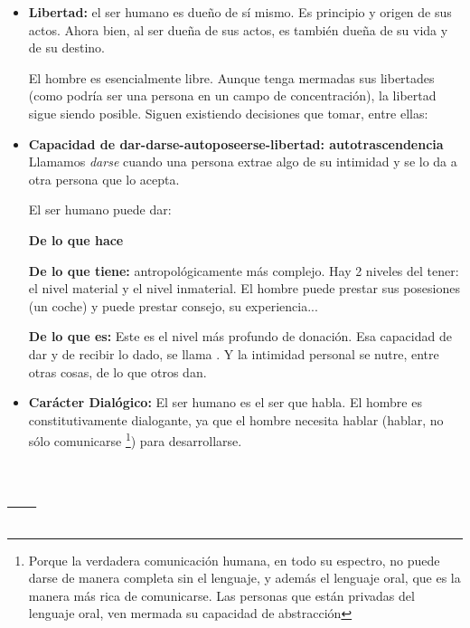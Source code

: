 \documentclass[palatino]{apuntesURJC}
\begin{document}
\begin{itemize}
	\subitem \textbf{Lenguaje:} \footnote{entendiendo lenguaje como lenguaje verbal.}
	A través del lenguaje hago público, comparto con otros aquello que antes estaba dentro de mi.

	El lenguaje tiene mayor capacidad expresiva que el cuerpo y puede permanecer (a través de la escritura sobretodo).

	\subitem \textbf{Acción:}
	Las personas nos damos a conocer con nuestros actos.
	La persona no es sólo sus acciones, pero es aquello que hace. \footnote{No sé si esta afirmación es lógicamente consistente en sí misma.}

	\item \textbf{Libertad:} el ser humano es dueño de sí mismo.
	Es principio y origen de sus actos. Ahora bien, al ser dueña de sus actos, es también dueña de su vida y de su destino.

	\subitem El hombre es esencialmente libre. Aunque tenga mermadas sus libertades (como podría ser una persona en un campo de concentración), la libertad sigue siendo posible.
	Siguen existiendo decisiones que tomar, entre ellas:

	\item \textbf{Capacidad de dar-darse-autoposeerse-libertad: autotrascendencia}
	Llamamos \textit{darse} cuando una persona extrae algo de su intimidad y se lo da a otra persona que lo acepta.

	El ser humano puede dar:

	\subitem \textbf{De lo que hace}

	\subitem \textbf{De lo que tiene:} antropológicamente más complejo. Hay 2 niveles del tener: el nivel material y el nivel inmaterial.
	El hombre puede prestar sus posesiones (un coche) y puede prestar consejo, su experiencia...

	\subitem \textbf{De lo que es:} Este es el nivel más profundo de donación.
	Esa capacidad de dar y de recibir lo dado, se llama .
	Y la intimidad personal se nutre, entre otras cosas, de lo que otros dan.

	\item \textbf{Carácter Dialógico:} El ser humano es el ser que habla.
	El hombre es constitutivamente dialogante, ya que el hombre necesita hablar (hablar, no sólo comunicarse
	\footnote{Porque la verdadera comunicación humana, en todo su espectro, no puede darse de manera completa sin el lenguaje, y además el lenguaje oral, que es la manera más rica de comunicarse.
	Las personas que están privadas del lenguaje oral, ven mermada su capacidad de abstracción})
	para desarrollarse.

\end{itemize}


\appendix

\chapter{---}


\printindex
\end{document}

